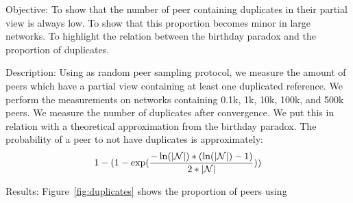 \begin{asparadesc} 
\item[Objective:] To show that the number of peer containing duplicates in
  their partial view is always low.  To show that this proportion becomes minor
  in large networks. To highlight the relation between the birthday paradox and
  the proportion of duplicates.

\item[Description:] Using \SCAMP as random peer sampling protocol, we measure
  the amount of peers which have a partial view containing at least one
  duplicated reference. We perform the measurements on networks containing
  0.1k, 1k, 10k, 100k, and 500k peers. We measure the number of duplicates
  after convergence. We put this in relation with a theoretical approximation
  from the birthday paradox. The probability of a peer to not have duplicates
  is approximately:
  \begin{equation}
    1- 
    (1-
    \exp({-\ln(|\mathcal{N}|)*(\ln(|\mathcal{N}|)-1)\over{2*|\mathcal{N}|}}))
  \end{equation}
\item[Results:] Figure~\ref{fig:duplicates} shows the proportion of peers using

\end{asparadesc}
